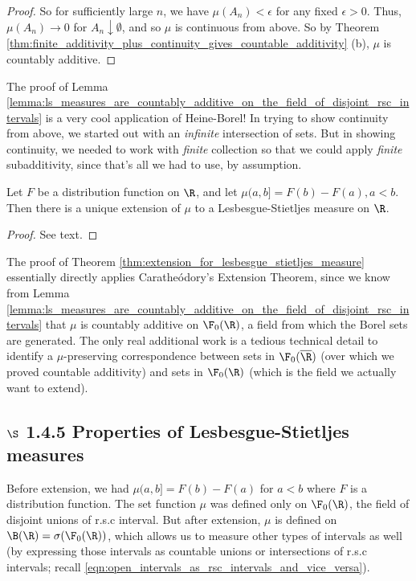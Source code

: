\documentclass{article} %
\begin{document}
\begin{proof}
So for sufficiently large $n$, we have $\mu(A_n) < \epsilon$ for any fixed $\epsilon >0$. Thus, $\mu(A_n) \to 0$ for $A_n \downarrow \emptyset$, and so $\mu$ is continuous from above.  So by Theorem \ref{thm:finite_additivity_plus_continuity_gives_countable_additivity} (b), $\mu$ is countably additive.
\end{proof}

\begin{remark}
The proof of Lemma \ref{lemma:ls_measures_are_countably_additive_on_the_field_of_disjoint_rsc_intervals} is a very cool application of Heine-Borel!  In trying to show continuity from above, we started out with an \textit{infinite} intersection of sets.  But in showing continuity, we needed to work with \textit{finite} collection so that we could apply \textit{finite} subadditivity, since that's all we had to use, by assumption. 
\end{remark}

\begin{theorem}
Let $F$ be a distribution function on $\R$, and let $\mu(a,b] = F(b) - F(a), a < b$.  Then there is a unique extension of $\mu$ to a Lesbesgue-Stietljes measure on $\R$.
\label{thm:extension_for_lesbesgue_stietljes_measure}
\end{theorem}

\begin{proof}
See text. 	
\end{proof}

\begin{remark}
The proof of Theorem \ref{thm:extension_for_lesbesgue_stietljes_measure}
essentially directly applies Carathe\'odory's Extension Theorem, since we know from Lemma \ref{lemma:ls_measures_are_countably_additive_on_the_field_of_disjoint_rsc_intervals} that $\mu$ is countably additive on $\F_0(\R)$, a field from which the Borel sets are generated.  The only real additional work is a tedious technical detail to identify a $\mu$-preserving correspondence between sets in $\F_0(\overline{\R})$ (over which we proved countable additivity) and sets in $\F_0(\R)$ (which is the field we actually want to extend).
\end{remark}

  \subsection{$\S$ 1.4.5 Properties of Lesbesgue-Stietljes measures}
 Before extension, we had $\mu(a,b] =F(b) - F(a)$ for $a < b$ where $F$ is a distribution function. The set function $\mu$ was defined only on $\F_0(\R)$, the field of disjoint unions of r.s.c interval.  But after extension, $\mu$ is defined on $\B(\R) = \sigma(\F_0(\R))$, which allows us to measure other types of intervals as well (by expressing those intervals as countable unions or intersections of r.s.c intervals; recall \eqref{eqn:open_intervals_as_rsc_intervals_and_vice_versa}).
 
\end{document}
